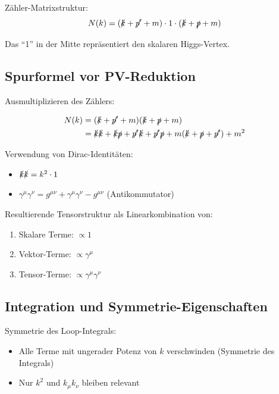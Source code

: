 	Zähler-Matrixstruktur:
	\begin{equation}
		N(k) = (\slashed{k} + \slashed{p'} + m) \cdot 1 \cdot (\slashed{k} + \slashed{p} + m)
	\end{equation}
	
	Das ``1'' in der Mitte repräsentiert den skalaren Higgs-Vertex.
	
	\subsection{Spurformel vor PV-Reduktion}
	
	Ausmultiplizieren des Zählers:
	
	\begin{align}
		N(k) &= (\slashed{k} + \slashed{p'} + m)(\slashed{k} + \slashed{p} + m)\\
		&= \slashed{k}\slashed{k} + \slashed{k}\slashed{p} + \slashed{p'}\slashed{k} + \slashed{p'}\slashed{p} + m(\slashed{k} + \slashed{p} + \slashed{p'}) + m^2
	\end{align}
	
	Verwendung von Dirac-Identitäten:
	\begin{itemize}
		\item $\slashed{k}\slashed{k} = k^2 \cdot 1$
		\item $\gamma^\mu\gamma^\nu = g^{\mu\nu} + \gamma^\mu\gamma^\nu - g^{\mu\nu}$ (Antikommutator)
	\end{itemize}
	
	Resultierende Tensorstruktur als Linearkombination von:
	\begin{enumerate}
		\item Skalare Terme: $\propto 1$
		\item Vektor-Terme: $\propto \gamma^\mu$  
		\item Tensor-Terme: $\propto \gamma^\mu\gamma^\nu$
	\end{enumerate}
	
	\subsection{Integration und Symmetrie-Eigenschaften}
	
	Symmetrie des Loop-Integrals:
	\begin{itemize}
		\item Alle Terme mit ungerader Potenz von $k$ verschwinden (Symmetrie des Integrals)
		\item Nur $k^2$ und $k_\mu k_\nu$ bleiben relevant
	\end{itemize}
	
